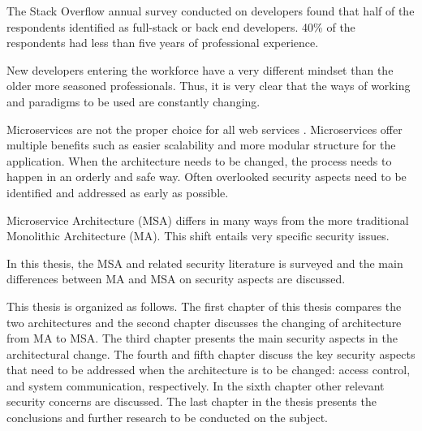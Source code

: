 \begin{sloppypar}
    The Stack Overflow annual survey \citep{sosurvey2019} conducted on
    developers found that half of the respondents identified as full-stack or
    back end developers. 40\% of the respondents had less than five years of
    professional experience.
\end{sloppypar}
\begin{sloppypar}
    New developers entering the workforce have a very different mindset than the
    older more seasoned professionals. Thus, it is very clear that the ways of
    working and paradigms to be used are constantly changing.
\end{sloppypar}
\begin{sloppypar}
    Microservices are not the proper choice for all web services
    \citep{newman2019}. Microservices offer multiple benefits such as easier
    scalability and more modular structure for the application. When the
    architecture needs to be changed, the process needs to happen in an orderly
    and safe way. Often overlooked security aspects need to be identified and
    addressed as early as possible.
\end{sloppypar}
\begin{sloppypar}
    Microservice Architecture (MSA) differs in many ways from the more
    traditional Monolithic Architecture (MA). This shift entails very specific
    security issues.
\end{sloppypar}
\begin{sloppypar}
    In this thesis, the MSA and related security literature is surveyed and the
    main differences between MA and MSA on security aspects are discussed.
\end{sloppypar}
\begin{sloppypar}
    This thesis is organized as follows. The first chapter of this thesis
    compares the two architectures and the second chapter discusses the changing
    of architecture from MA to MSA. The third chapter presents the main security
    aspects in the architectural change. The fourth and fifth chapter discuss
    the key security aspects that need to be addressed when the architecture is
    to be changed: access control, and system communication, respectively. In
    the sixth chapter other relevant security concerns are discussed. The last
    chapter in the thesis presents the conclusions and further research to be
    conducted on the subject.
\end{sloppypar}




